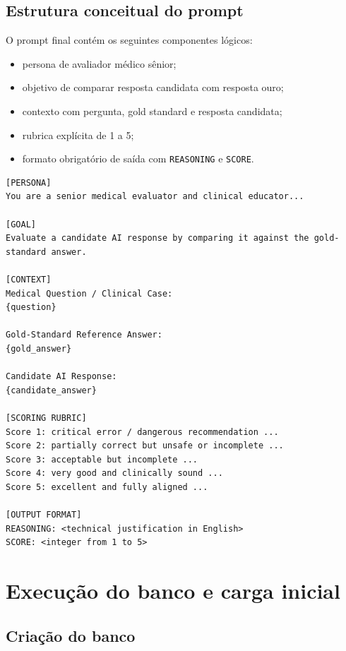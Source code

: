 \documentclass[12pt,a4paper]{article}
\begin{document}
\subsection{Estrutura conceitual do prompt}

O prompt final contém os seguintes componentes lógicos:

\begin{itemize}[leftmargin=1.2cm]
    \item persona de avaliador médico sênior;
    \item objetivo de comparar resposta candidata com resposta ouro;
    \item contexto com pergunta, gold standard e resposta candidata;
    \item rubrica explícita de 1 a 5;
    \item formato obrigatório de saída com \texttt{REASONING} e \texttt{SCORE}.
\end{itemize}

\begin{lstlisting}[caption={Estrutura resumida do prompt medico em ingles},label={lst:prompt}]
[PERSONA]
You are a senior medical evaluator and clinical educator...

[GOAL]
Evaluate a candidate AI response by comparing it against the gold-standard answer.

[CONTEXT]
Medical Question / Clinical Case:
{question}

Gold-Standard Reference Answer:
{gold_answer}

Candidate AI Response:
{candidate_answer}

[SCORING RUBRIC]
Score 1: critical error / dangerous recommendation ...
Score 2: partially correct but unsafe or incomplete ...
Score 3: acceptable but incomplete ...
Score 4: very good and clinically sound ...
Score 5: excellent and fully aligned ...

[OUTPUT FORMAT]
REASONING: <technical justification in English>
SCORE: <integer from 1 to 5>
\end{lstlisting}

\section{Execução do banco e carga inicial}

\subsection{Criação do banco}
\end{document}
